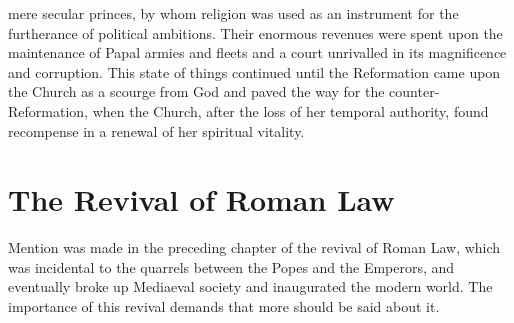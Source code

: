 \documentclass{book}
\begin{document}
mere secular princes, by whom religion was used as an instrument for the furtherance of political ambitions. Their enormous revenues were spent upon the maintenance of Papal armies and fleets and a court unrivalled in its magnificence and corruption. This state of things continued until the Reformation came upon the Church as a scourge from God and paved the way for the counter-Reformation, when the Church, after the loss of her temporal authority, found recompense in a renewal of her spiritual vitality.

\chapter{The Revival of Roman Law}
\label{chapter-4}
Mention was made in the preceding chapter of the revival of Roman Law, which was incidental to the quarrels between the Popes and the Emperors, and eventually broke up Mediaeval society and inaugurated the modern world. The importance of this revival demands that more should be said about it.
\end{document}
